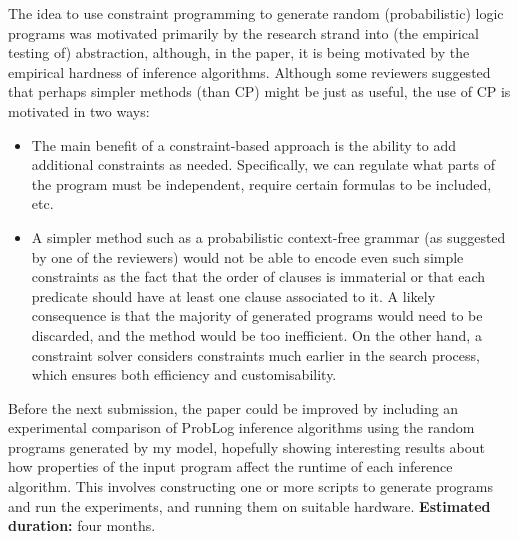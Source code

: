 \documentclass{article}
\begin{document}
The idea to use constraint programming to generate random (probabilistic) logic
programs was motivated primarily by the research strand into (the empirical
testing of) abstraction, although, in the paper, it is being motivated by the
empirical hardness of inference algorithms. Although some reviewers suggested
that perhaps simpler methods (than CP) might be just as useful, the use of CP is
motivated in two ways:
\begin{itemize}
\item The main benefit of a constraint-based approach is the ability to add
  additional constraints as needed. Specifically, we can regulate what parts of
  the program must be independent, require certain formulas to be included, etc.
\item A simpler method such as a probabilistic context-free grammar (as
  suggested by one of the reviewers) would not be able to encode even such
  simple constraints as the fact that the order of clauses is immaterial or that
  each predicate should have at least one clause associated to it. A likely
  consequence is that the majority of generated programs would need to be
  discarded, and the method would be too inefficient. On the other hand, a
  constraint solver considers constraints much earlier in the search process,
  which ensures both efficiency and customisability.
\end{itemize}

Before the next submission, the paper could be improved by including an
experimental comparison of ProbLog inference algorithms using the random
programs generated by my model, hopefully showing interesting results about how
properties of the input program affect the runtime of each inference algorithm.
This involves constructing one or more scripts to generate programs and run the
experiments, and running them on suitable hardware. {\bf Estimated duration:}
four months.
\end{document}
